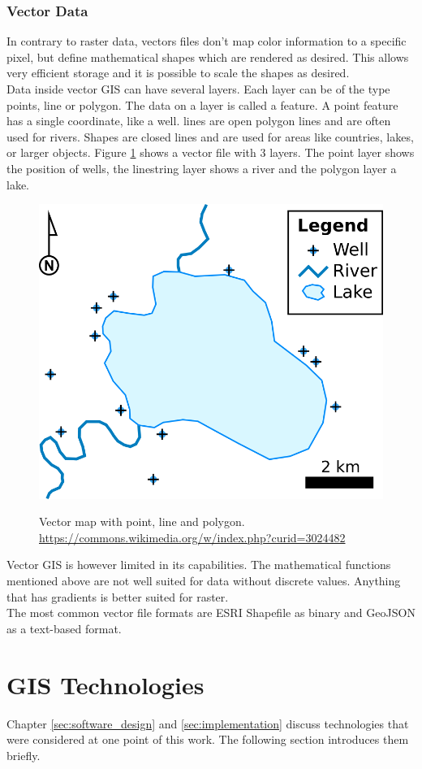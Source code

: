 \subsubsection{Vector Data}
In contrary to raster data, vectors files don't map color information to a specific pixel, but define mathematical shapes which are rendered as desired. This allows very efficient storage and it is possible to scale the shapes as desired.\\
Data inside vector GIS can have several layers. Each layer can be of the type points, line or polygon. The data on a layer is called a feature. A point feature has a single coordinate, like a well. lines are open polygon lines and are often used for rivers. Shapes are closed lines and are used for areas like countries, lakes, or larger objects. Figure \ref{img:vector} shows a vector file with 3 layers. The point layer shows the position of wells, the linestring layer shows a river and the polygon layer a lake.\\
\begin{figure}[H] 
	\centering
	\includegraphics[width=0.4\columnwidth]{res/vector-map}\\
	\caption[]{Vector map with point, line and polygon. \url{https://commons.wikimedia.org/w/index.php?curid=3024482}}
	\label{img:vector}
\end{figure}

Vector GIS is however limited in its capabilities. The mathematical functions mentioned above are not well suited for data without discrete values. Anything that has gradients is better suited for raster.\\
The most common vector file formats are ESRI Shapefile as binary and GeoJSON as a text-based format.



\section{GIS Technologies}
Chapter \ref{sec:software_design} and \ref{sec:implementation} discuss technologies that were considered at one point of this work. The following section introduces them briefly.


